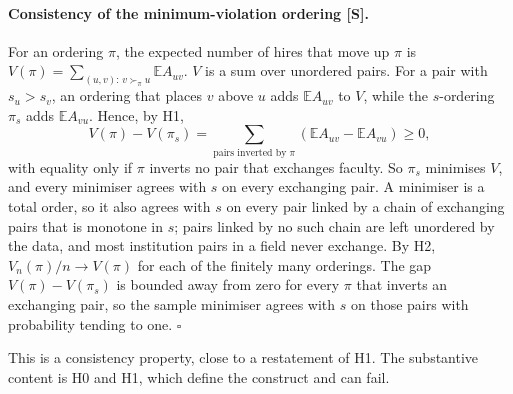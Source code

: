 \paragraph{Consistency of the minimum-violation ordering [S].} For an ordering $\pi$, the expected number of
hires that move up $\pi$ is $V(\pi)=\sum_{(u,v):\,v\succ_\pi u}\mathbb E A_{uv}$. $V$ is a sum over unordered
pairs. For a pair with $s_u>s_v$, an ordering that places $v$ above $u$ adds $\mathbb E A_{uv}$ to $V$, while
the $s$-ordering $\pi_s$ adds $\mathbb E A_{vu}$. Hence, by H1,
\[
V(\pi)-V(\pi_s)=\sum_{\text{pairs inverted by }\pi}(\mathbb E A_{uv}-\mathbb E A_{vu})\ge0 ,
\]
with equality only if $\pi$ inverts no pair that exchanges faculty. So $\pi_s$ minimises $V$, and every minimiser
agrees with $s$ on every exchanging pair. A minimiser is a total order, so it also agrees with $s$ on every pair
linked by a chain of exchanging pairs that is monotone in $s$; pairs linked by no such chain are left unordered
by the data, and most institution pairs in a field never exchange. By H2, $V_n(\pi)/n\to V(\pi)$ for each of the
finitely many orderings. The gap $V(\pi)-V(\pi_s)$ is bounded away from zero for every $\pi$ that inverts an
exchanging pair, so the sample minimiser \citep{clauset2015systematic} agrees with $s$ on those pairs with
probability tending to one. $\square$

This is a consistency property, close to a restatement of H1. The substantive content is H0 and H1, which define
the construct and can fail.

